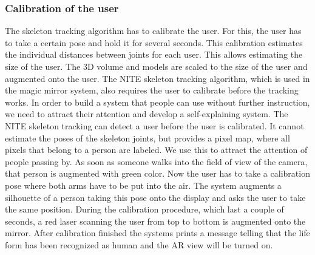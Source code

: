 {{\subsubsection{Calibration of the user}
The skeleton tracking algorithm has to calibrate the user. For this, the user has to take a certain pose and hold it for several seconds. This calibration estimates the individual distances between joints for each user. This allows estimating the size of the user. The 3D volume and models are scaled to the size of the user and augmented onto the user.  
The NITE skeleton tracking algorithm, which is used in the magic mirror system, also requires the user to calibrate before the tracking works. In order to build a system that people can use without further instruction, we need to attract their attention and develop a self-explaining system. The NITE skeleton tracking can detect a user before the user is calibrated. It cannot estimate the poses of the skeleton joints, but provides a pixel map, where all pixels that belong to a person are labeled. We use this to attract the attention of people passing by. As soon as someone walks into the field of view of the camera, that person is augmented with green color. Now the user has to take a calibration pose where both arms have to be put into the air. The system augments a silhouette of a person taking this pose onto the display and asks the user to take the same position. During the calibration procedure, which last a couple of seconds, a red laser scanning the user from top to bottom is augmented onto the mirror. After calibration finished the systems prints a message telling that the life form has been recognized as human and the AR view will be turned on.

}}
